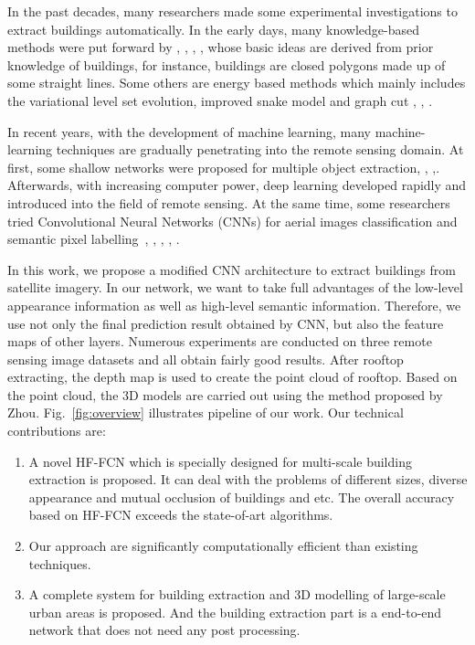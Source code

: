 In the past decades, many researchers made some experimental investigations to extract buildings automatically. In the early days, many knowledge-based methods were put forward by \cite{IEEEexample:huertas1988detecting}, \cite{IEEEexample:noronha2001detection}, \cite{IEEEexample:nosrati2009novel}, \cite{IEEEexample:izadi2012three}, \cite{IEEEexample:wang2015efficient} whose basic ideas are derived from prior knowledge of buildings, for instance, buildings are closed polygons made up of some straight lines. Some others are energy based methods which mainly includes the variational level set evolution, improved snake model and graph cut \cite{IEEEexample:cote2013automatic}, \cite{IEEEexample:peng2005improved}, \cite{IEEEexample:sirmacek2009urban}.


In recent years, with the development of machine learning, many machine-learning techniques are gradually penetrating into the remote sensing domain. 
At first, some shallow networks were proposed for multiple object extraction\cite{IEEEexample:mnih2013machine}, \cite{IEEEexample:saito2016multiple}, \cite{IEEEexample:alshehhi2017simultaneous},\cite{IEEEexample:zhao2017contextually}. Afterwards, with increasing computer power, deep learning developed rapidly and introduced into the field of remote sensing. At the same time, some researchers tried Convolutional Neural Networks (CNNs) for aerial images classification and semantic pixel labelling~\cite{IEEEexample:paisitkriangkrai2015effective}, \cite{IEEEexample:liu2017dense}, \cite{IEEEexample:audebert2017deep}, \cite{IEEEexample:kampffmeyer2017urban}, \cite{IEEEexample:he2017multi}.


In this work, we propose a modified CNN architecture to extract buildings from satellite imagery. In our network, we want to take full advantages of the low-level appearance information as well as high-level semantic information. 
Therefore, we use not only the final prediction result obtained by CNN, but also the feature maps of other layers. Numerous experiments are conducted on three remote sensing image datasets and all obtain fairly good results. After rooftop extracting, the depth map is used to create the point cloud of rooftop. Based on the point cloud, the 3D models are carried out using the method proposed by Zhou\cite{IEEEexample:zhou20112}. Fig.~\ref{fig:overview} illustrates pipeline of our work. Our technical contributions are: 
%
\begin{enumerate}
	\item A novel HF-FCN which is specially designed for multi-scale building extraction is proposed. It can deal with the problems of different sizes, diverse appearance and mutual occlusion of buildings and etc. The overall accuracy based on HF-FCN exceeds the state-of-art algorithms.
	\item Our approach are significantly computationally efficient than existing techniques.
	\item A complete system for building extraction and 3D modelling of large-scale urban areas is proposed. And the building extraction part is a end-to-end network that does not need any post processing.
\end{enumerate}
 
